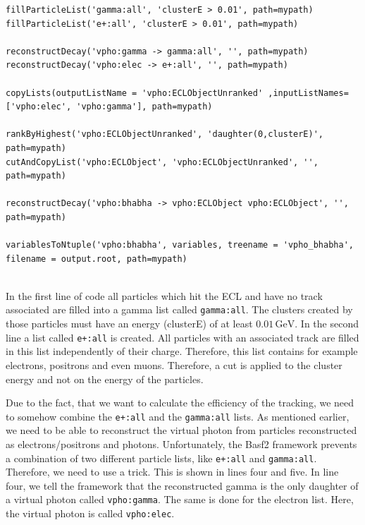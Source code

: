 \documentclass[a4paper,11pt,twosided,final,german,openbib,pdftex,listof=totoc,bibliography=totoc]{scrbook}
\begin{document}
{\small
\begin{lstlisting}
fillParticleList('gamma:all', 'clusterE > 0.01', path=mypath)
fillParticleList('e+:all', 'clusterE > 0.01', path=mypath)

reconstructDecay('vpho:gamma -> gamma:all', '', path=mypath)
reconstructDecay('vpho:elec -> e+:all', '', path=mypath)

copyLists(outputListName = 'vpho:ECLObjectUnranked' ,inputListNames=['vpho:elec', 'vpho:gamma'], path=mypath)

rankByHighest('vpho:ECLObjectUnranked', 'daughter(0,clusterE)', path=mypath)
cutAndCopyList('vpho:ECLObject', 'vpho:ECLObjectUnranked', '', path=mypath)
	
reconstructDecay('vpho:bhabha -> vpho:ECLObject vpho:ECLObject', '', path=mypath)

variablesToNtuple('vpho:bhabha', variables, treename = 'vpho_bhabha', filename = output.root, path=mypath)
	
\end{lstlisting}
}
\bigskip







In the first line of code all particles which hit the ECL and have no track associated are filled into a gamma list called \texttt{gamma:all}. The clusters created by those particles must have an energy (clusterE) of at least $0.01\,\textrm{GeV}$. In the second line a list called \texttt{e+:all} is created. All particles with an associated track are filled in this list independently of their charge. Therefore, this list contains for example electrons, positrons and even muons. Therefore, a cut is applied to the cluster energy and not on the energy of the particles.


Due to the fact, that we want to calculate the efficiency of the tracking, we need to somehow combine the \texttt{e+:all} and the \texttt{gamma:all} lists. As mentioned earlier, we need to be able to reconstruct the virtual photon from particles reconstructed as electrons/positrons and photons.
Unfortunately, the Basf2 framework prevents a combination of two different particle lists, like \texttt{e+:all} and \texttt{gamma:all}. Therefore, we need to use a trick. This is shown in lines four and five. In line four, we tell the framework that the reconstructed gamma is the only daughter of a virtual photon called \texttt{vpho:gamma}. The same is done for the electron list. Here, the virtual photon is called \texttt{vpho:elec}. 
\end{document}
